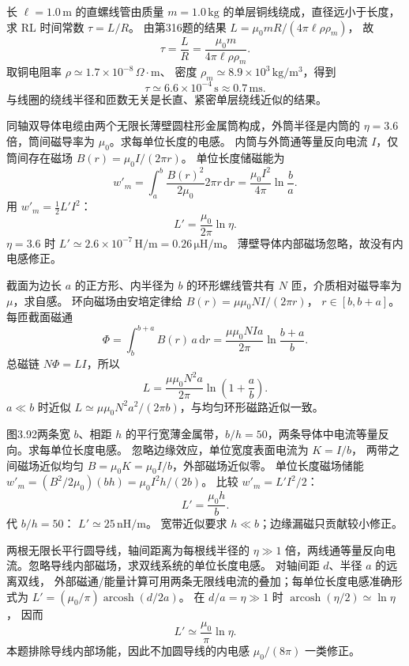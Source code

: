 长 $\ell=1.0\,\mathrm m$ 的直螺线管由质量 $m=1.0\,\mathrm{kg}$ 的单层铜线绕成，直径远小于长度，求 RL 时间常数 $\tau=L/R$。
\exsolution
由第316题的结果
$L=\mu_0mR/(4\pi\ell\rho\rho_m)$，
故
\[
\boxed{\tau=\frac LR=\frac{\mu_0m}{4\pi\ell\rho\rho_m}}.
\]
取铜电阻率
$\rho\simeq1.7\times10^{-8}\,\Omega\cdot\mathrm m$、
密度 $\rho_m\simeq8.9\times10^3\,\mathrm{kg/m^3}$，得到
\[
\boxed{\tau\simeq6.6\times10^{-4}\,\mathrm s
\approx0.7\,\mathrm{ms}}.
\]
\excheck 与线圈的绕线半径和匝数无关是长直、紧密单层绕线近似的结果。

同轴双导体电缆由两个无限长薄壁圆柱形金属筒构成，外筒半径是内筒的 $\eta=3.6$ 倍，筒间磁导率为 $\mu_0$。求每单位长度的电感。
\exsolution
内筒与外筒通等量反向电流 $I$，仅筒间存在磁场
$B(r)=\mu_0I/(2\pi r)$。
单位长度储磁能为
\[
w'_m=\int_a^b\frac{B(r)^2}{2\mu_0}2\pi r\,\mathrm dr
=\frac{\mu_0I^2}{4\pi}\ln\frac ba.
\]
用 $w'_m=\tfrac12L'I^2$：
\[
\boxed{L'=\frac{\mu_0}{2\pi}\ln\eta}.
\]
$\eta=3.6$ 时
$\boxed{L'\simeq2.6\times10^{-7}\,\mathrm{H/m}
=0.26\,\mathrm{\mu H/m}}$。
\excheck 薄壁导体内部磁场忽略，故没有内电感修正。

截面为边长 $a$ 的正方形、内半径为 $b$ 的环形螺线管共有 $N$ 匝，介质相对磁导率为 $\mu$，求自感。
\exsolution
环向磁场由安培定律给
$B(r)=\mu\mu_0NI/(2\pi r)$，
$r\in[b,b+a]$。
每匝截面磁通
\[
\Phi=\int_b^{b+a}B(r)\,a\,\mathrm dr
=\frac{\mu\mu_0NIa}{2\pi}\ln\frac{b+a}{b}.
\]
总磁链 $N\Phi=LI$，所以
\[
\boxed{L=\frac{\mu\mu_0N^2a}{2\pi}
\ln\left(1+\frac ab\right)}.
\]
\excheck $a\ll b$ 时近似
$L\simeq\mu\mu_0N^2a^2/(2\pi b)$，与均匀环形磁路近似一致。

图3.92两条宽 $b$、相距 $h$ 的平行宽薄金属带，$b/h=50$，两条导体中电流等量反向。求每单位长度电感。
\exsolution
忽略边缘效应，单位宽度表面电流为 $K=I/b$，
两带之间磁场近似均匀
$B=\mu_0K=\mu_0I/b$，外部磁场近似零。
单位长度磁场储能
$w'_m=(B^2/2\mu_0)(bh)
=\mu_0I^2h/(2b)$。
比较 $w'_m=L'I^2/2$：
\[
\boxed{L'=\frac{\mu_0h}{b}}.
\]
代 $b/h=50$：
$\boxed{L'\simeq25\,\mathrm{nH/m}}$。
\excheck 宽带近似要求 $h\ll b$；边缘漏磁只贡献较小修正。

两根无限长平行圆导线，轴间距离为每根线半径的 $\eta\gg1$ 倍，两线通等量反向电流。忽略导线内部磁场，求双线系统的单位长度电感。
\exsolution
对轴间距 $d$、半径 $a$ 的远离双线，
外部磁通/能量计算可用两条无限线电流的叠加；每单位长度电感准确形式为
$L'=(\mu_0/\pi)\operatorname{arcosh}(d/2a)$。
在 $d/a=\eta\gg1$ 时
$\operatorname{arcosh}(\eta/2)\simeq\ln\eta$，
因而
\[
\boxed{L'\simeq\frac{\mu_0}{\pi}\ln\eta}.
\]
\excheck 本题排除导线内部场能，因此不加圆导线的内电感 $\mu_0/(8\pi)$ 一类修正。

